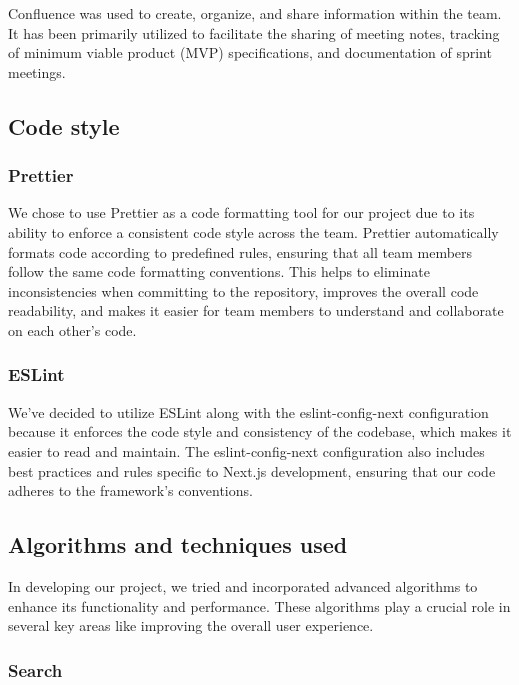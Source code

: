 Confluence was used to create, organize, and share information within the team. It has been primarily utilized to facilitate the sharing of meeting notes, tracking of minimum viable product (MVP) specifications, and documentation of sprint meetings. 

\subsection{Code style}

\subsubsection{Prettier}

We chose to use Prettier as a code formatting tool for our project due to its ability to enforce a consistent code style across the team. Prettier automatically formats code according to predefined rules, ensuring that all team members follow the same code formatting conventions. This helps to eliminate inconsistencies when committing to the repository, improves the overall code readability, and makes it easier for team members to understand and collaborate on each other's code. 

\subsubsection{ESLint}

We’ve decided to utilize ESLint along with the eslint-config-next configuration because it enforces the code style and consistency of the codebase, which makes it easier to read and maintain. The eslint-config-next configuration also includes best practices and rules specific to Next.js development, ensuring that our code adheres to the framework's conventions. \cite{Nextjs_ESLint} 

\subsection{Algorithms and techniques used}

In developing our project, we tried and incorporated advanced algorithms to enhance its functionality and performance. These algorithms play a crucial role in several key areas like improving the overall user experience. 

\subsubsection{Search}

